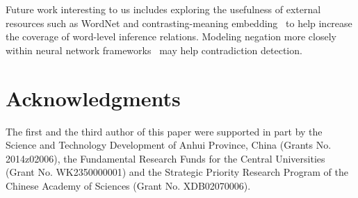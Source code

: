 \documentclass[11pt,a4paper]{article}
\begin{document}
Future work interesting to us includes exploring the usefulness of external resources such as WordNet and contrasting-meaning embedding~\cite{Chen:P15-1011} to help increase the coverage of word-level inference relations. Modeling negation more closely within neural network frameworks~\cite{Socher:D13-1170,Zhu:P14-1029} may help contradiction detection.  

\section*{Acknowledgments}
The first and the third author of this paper were supported in part by the Science and Technology Development of Anhui Province, China (Grants No. 2014z02006), the Fundamental Research Funds for the Central Universities (Grant No. WK2350000001) and the Strategic Priority Research Program of the Chinese Academy of Sciences (Grant No.
XDB02070006).

\clearpage


\end{document}
